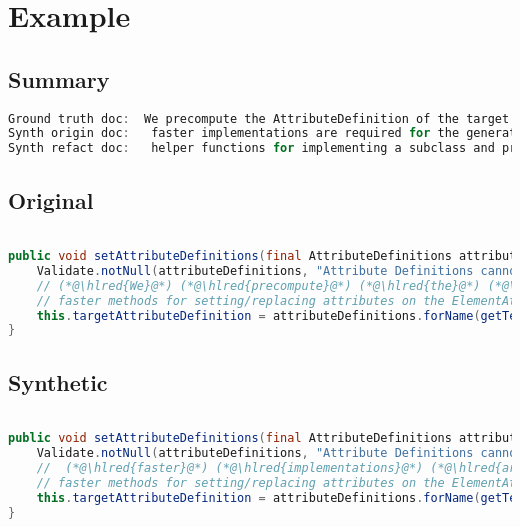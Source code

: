 \documentclass[11pt]{article}
\DeclareRobustCommand{\hlred}[1]{{\sethlcolor{YellowOrange}\hl{#1}}}
\begin{document}
\pagebreak
\section{Example}
\subsection{Summary}

\begin{lstlisting}[language=java]
Ground truth doc:  We precompute the AttributeDefinition of the target attribute in order to being able to use much
Synth origin doc:   faster implementations are required for the generation but cannot override or replace attributes instead of just
Synth refact doc:   helper functions for implementing a subclass and providing a lot to provide for simplicity and for
\end{lstlisting}

\subsection{Original}
\begin{lstlisting}[language=java]

public void setAttributeDefinitions(final AttributeDefinitions attributeDefinitions) {
    Validate.notNull(attributeDefinitions, "Attribute Definitions cannot be null");
    // (*@\hlred{We}@*) (*@\hlred{precompute}@*) (*@\hlred{the}@*) (*@\hlred{AttributeDefinition}@*) (*@\hlred{of}@*) the (*@\hlred{target}@*) (*@\hlred{attribute}@*) (*@\hlred{in}@*) (*@\hlred{order}@*) (*@\hlred{to}@*) (*@\hlred{being}@*) (*@\hlred{able}@*) (*@\hlred{to}@*) (*@\hlred{use}@*) (*@\hlred{much}@*)
    // faster methods for setting/replacing attributes on the ElementAttributes implementation
    this.targetAttributeDefinition = attributeDefinitions.forName(getTemplateMode(), this.targetAttrCompleteName);
}
\end{lstlisting}
\subsection{Synthetic}

\begin{lstlisting}[language=java]

public void setAttributeDefinitions(final AttributeDefinitions attributeDefinitions) {
    Validate.notNull(attributeDefinitions, "Attribute Definitions cannot be null");
    //  (*@\hlred{faster}@*) (*@\hlred{implementations}@*) (*@\hlred{are}@*) (*@\hlred{required}@*) (*@\hlred{for}@*) the (*@\hlred{generation}@*) (*@\hlred{but}@*) (*@\hlred{cannot}@*) (*@\hlred{override}@*) (*@\hlred{or}@*) (*@\hlred{replace}@*) (*@\hlred{attributes}@*) (*@\hlred{instead}@*) (*@\hlred{of}@*) (*@\hlred{just}@*)
    // faster methods for setting/replacing attributes on the ElementAttributes implementation
    this.targetAttributeDefinition = attributeDefinitions.forName(getTemplateMode(), this.targetAttrCompleteName);
}
\end{lstlisting}
\end{document}
